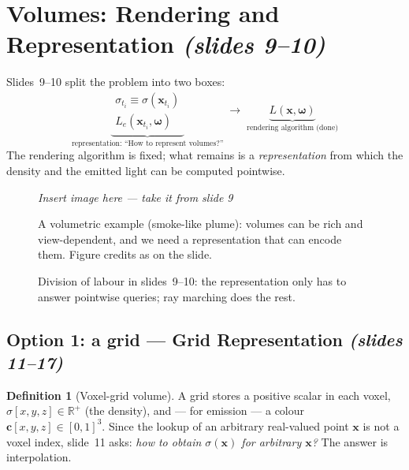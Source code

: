 \documentclass[11pt,a4paper]{article}
\newcommand{\R}{\mathbb{R}}
\newcommand{\xx}{\boldsymbol{x}}
\newcommand{\om}{\boldsymbol{\omega}}
\newcommand{\cc}{\boldsymbol{c}}
\newcommand{\Le}{L_e}
\newcommand{\sref}[1]{\texorpdfstring{\emph{(slides #1)}}{(slides #1)}}
\theoremstyle{definition}
\newtheorem{definition}{Definition}[section]
\theoremstyle{plain}
\newcommand{\slideimg}[3]{%
\begin{figure}[H]
\centering
\begin{tcolorbox}[enhanced,colback=white,colframe=white,boxrule=0pt,sharp corners,overlay={\draw[dashed,gray,thick] (frame.south west) rectangle (frame.north east);},
  width=0.92\linewidth,height=#2,valign=center,halign=center]
{\color{gray}\itshape Insert image here --- take it from slide #1}
\end{tcolorbox}
\caption{#3}
\end{figure}}
\begin{document}
\section{Volumes: Rendering and Representation \sref{9--10}}

Slides~9--10 split the problem into two boxes:
\[
\underbrace{\begin{matrix}\sigma_{t_i}\equiv\sigma(\xx_{t_i})\\ \Le(\xx_{t_i},\om)\end{matrix}}_{\text{representation: ``How to represent volumes?''}}
\;\longrightarrow\;
\underbrace{L(\xx,\om)}_{\text{rendering algorithm (done)}}
\]
The rendering algorithm is fixed; what remains is a \emph{representation} from which the density and the emitted light can be computed pointwise.

\slideimg{9}{4.2cm}{A volumetric example (smoke-like plume): volumes can be rich and view-dependent, and we need a representation that can encode them. Figure credits as on the slide.}

\begin{figure}[H]
\centering
{}
\caption{Division of labour in slides~9--10: the representation only has to answer pointwise queries; ray marching does the rest.}
\end{figure}

\subsection{Option 1: a grid --- Grid Representation \sref{11--17}}

\begin{definition}[Voxel-grid volume]
A grid stores a positive scalar in each voxel, $\sigma[x,y,z]\in\R^+$ (the density), and --- for emission --- a colour $\cc[x,y,z]\in[0,1]^3$. Since the lookup of an arbitrary real-valued point $\xx$ is not a voxel index, slide~11 asks: \emph{how to obtain $\sigma(\xx)$ for arbitrary $\xx$?} The answer is interpolation.
\end{definition}
\end{document}
